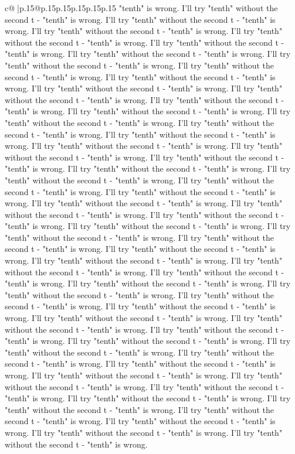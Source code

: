 \documentclass{article}
\begin{document}
{\begin{supertabular}{c@{$\;$}|p{.15\linewidth}@{}p{.15\linewidth}p{.15\linewidth}p{.15\linewidth}p{.15\linewidth}p{.15\linewidth}}
{{{"tenth" is wrong. I'll try "tenth" without the second t {-} "tenth" is wrong. I'll try "tenth" without the second t {-} "tenth" is wrong. I'll try "tenth" without the second t {-} "tenth" is wrong. I'll try "tenth" without the second t {-} "tenth" is wrong. I'll try "tenth" without the second t {-} "tenth" is wrong. I'll try "tenth" without the second t {-} "tenth" is wrong. I'll try "tenth" without the second t {-} "tenth" is wrong. I'll try "tenth" without the second t {-} "tenth" is wrong. I'll try "tenth" without the second t {-} "tenth" is wrong. I'll try "tenth" without the second t {-} "tenth" is wrong. I'll try "tenth" without the second t {-} "tenth" is wrong. I'll try "tenth" without the second t {-} "tenth" is wrong. I'll try "tenth" without the second t {-} "tenth" is wrong. I'll try "tenth" without the second t {-} "tenth" is wrong. I'll try "tenth" without the second t {-} "tenth" is wrong. I'll try "tenth" without the second t {-} "tenth" is wrong. I'll try "tenth" without the second t {-} "tenth" is wrong. I'll try "tenth" without the second t {-} "tenth" is wrong. I'll try "tenth" without the second t {-} "tenth" is wrong. I'll try "tenth" without the second t {-} "tenth" is wrong. I'll try "tenth" without the second t {-} "tenth" is wrong. I'll try "tenth" without the second t {-} "tenth" is wrong. I'll try "tenth" without the second t {-} "tenth" is wrong. I'll try "tenth" without the second t {-} "tenth" is wrong. I'll try "tenth" without the second t {-} "tenth" is wrong. I'll try "tenth" without the second t {-} "tenth" is wrong. I'll try "tenth" without the second t {-} "tenth" is wrong. I'll try "tenth" without the second t {-} "tenth" is wrong. I'll try "tenth" without the second t {-} "tenth" is wrong. I'll try "tenth" without the second t {-} "tenth" is wrong. I'll try "tenth" without the second t {-} "tenth" is wrong. I'll try "tenth" without the second t {-} "tenth" is wrong. I'll try "tenth" without the second t {-} "tenth" is wrong. I'll try "tenth" without the second t {-} "tenth" is wrong. I'll try "tenth" without the second t {-} "tenth" is wrong. I'll try "tenth" without the second t {-} "tenth" is wrong. I'll try "tenth" without the second t {-} "tenth" is wrong. I'll try "tenth" without the second t {-} "tenth" is wrong. I'll try "tenth" without the second t {-} "tenth" is wrong. I'll try "tenth" without the second t {-} "tenth" is wrong. I'll try "tenth" without the second t {-} "tenth" is wrong. I'll try "tenth" without the second t {-} "tenth" is wrong. I'll try "tenth" without the second t {-} "tenth" is wrong. I'll try "tenth" without the second t {-} "tenth" is wrong. I'll try "tenth" without the second t {-} "tenth" is wrong. I'll try "tenth" without the second t {-} "tenth" is wrong. I'll try "tenth" without the second t {-} "tenth" is wrong. I'll try "tenth" without the second t {-} "tenth" is wrong. I'll try "tenth" without the second t {-} "tenth" is wrong. I'll try "tenth" without the second t {-} "tenth" is wrong. I'll try "tenth" without the second t {-} "tenth" is wrong. I'll try "tenth" without the second t {-} "tenth" is wrong. I'll try "tenth" without the second t {-} "tenth" is wrong. }}}
\end{supertabular}}
\end{document}
